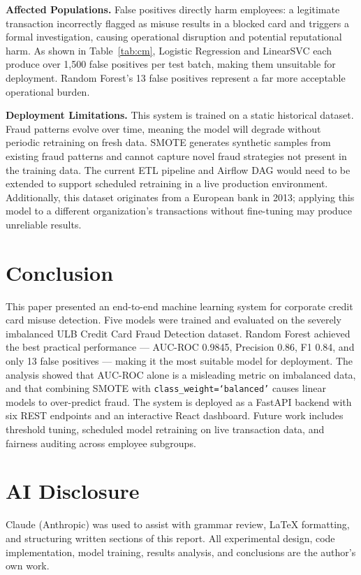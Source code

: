 \documentclass{article}
\begin{document}
\textbf{Affected Populations.}
False positives directly harm employees: a legitimate transaction
incorrectly flagged as misuse results in a blocked card and triggers a
formal investigation, causing operational disruption and potential
reputational harm. As shown in Table~\ref{tab:cm}, Logistic Regression
and LinearSVC each produce over 1,500 false positives per test batch,
making them unsuitable for deployment. Random Forest's 13 false positives
represent a far more acceptable operational burden.

\textbf{Deployment Limitations.}
This system is trained on a static historical dataset. Fraud patterns
evolve over time, meaning the model will degrade without periodic
retraining on fresh data. SMOTE generates synthetic samples from existing
fraud patterns and cannot capture novel fraud strategies not present in
the training data. The current ETL pipeline and Airflow DAG would need
to be extended to support scheduled retraining in a live production
environment. Additionally, this dataset originates from a European bank
in 2013; applying this model to a different organization's transactions
without fine-tuning may produce unreliable results.

\section{Conclusion}

This paper presented an end-to-end machine learning system for corporate
credit card misuse detection. Five models were trained and evaluated on
the severely imbalanced ULB Credit Card Fraud Detection dataset. Random
Forest achieved the best practical performance --- AUC-ROC 0.9845,
Precision 0.86, F1 0.84, and only 13 false positives --- making it the
most suitable model for deployment. The analysis showed that AUC-ROC
alone is a misleading metric on imbalanced data, and that combining SMOTE
with \texttt{class\_weight=`balanced'} causes linear models to
over-predict fraud. The system is deployed as a FastAPI backend with six
REST endpoints and an interactive React dashboard. Future work includes
threshold tuning, scheduled model retraining on live transaction data,
and fairness auditing across employee subgroups.

\section*{AI Disclosure}

Claude (Anthropic) was used to assist with grammar review, LaTeX
formatting, and structuring written sections of this report. All
experimental design, code implementation, model training, results
analysis, and conclusions are the author's own work.



\end{document}
